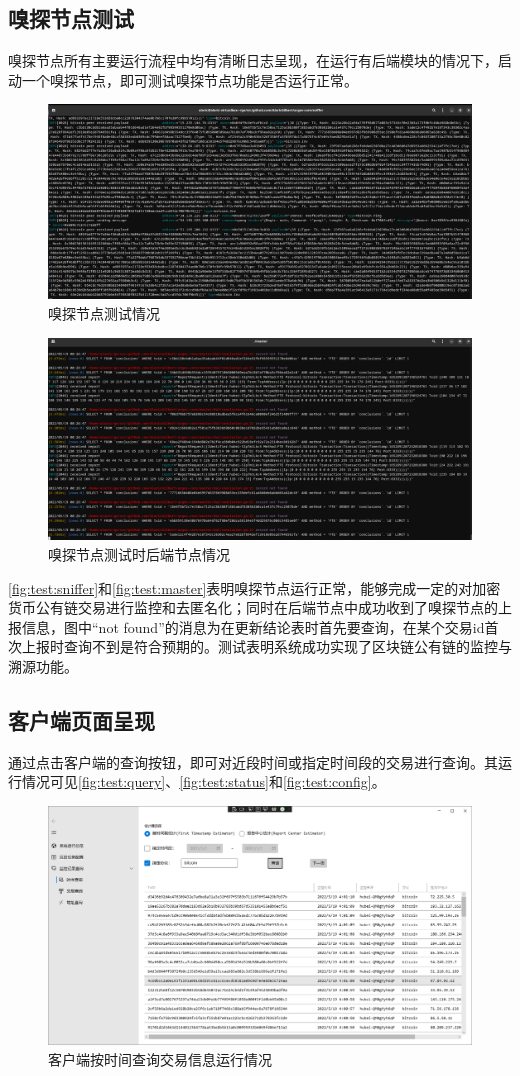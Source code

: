 \documentclass[supercite]{HustGraduPaper}
\newcommand{\xfig}[3]{
  \begin{figure}[htb]
    \centering
    #3
    \caption{#2}
    \label{fig:#1}
  \end{figure}
}
\newcommand{\rfig}[1]{\autoref{fig:#1}}
\theoremstyle{definition}
\begin{document}
\subsection{嗅探节点测试}
嗅探节点所有主要运行流程中均有清晰日志呈现，在运行有后端模块的情况下，启动一个嗅探节点，即可测试嗅探节点功能是否运行正常。
\xfig{test:sniffer}{嗅探节点测试情况}{
  \includegraphics[width=\textwidth]{images/5.3-sniffer.png}
}
\xfig{test:master}{嗅探节点测试时后端节点情况}{
  \includegraphics[width=\textwidth]{images/5.3-master.png}
}

\rfig{test:sniffer}和\rfig{test:master}表明嗅探节点运行正常，能够完成一定的对加密货币公有链交易进行监控和去匿名化；同时在后端节点中成功收到了嗅探节点的上报信息，图中“not found”的消息为在更新结论表时首先要查询，在某个交易id首次上报时查询不到是符合预期的。测试表明系统成功实现了区块链公有链的监控与溯源功能。
\subsection{客户端页面呈现}
通过点击客户端的查询按钮，即可对近段时间或指定时间段的交易进行查询。其运行情况可见\rfig{test:query}、\rfig{test:status}和\rfig{test:config}。

\xfig{test:query}{客户端按时间查询交易信息运行情况}{
  \includegraphics[width=\textwidth]{images/5.4-query.png}
}
\end{document}
